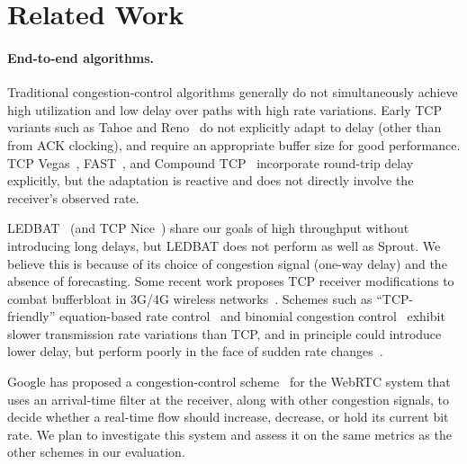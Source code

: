 \section{Related Work}
\label{sprout:related}

\paragraph{End-to-end algorithms.}

Traditional congestion-control algorithms generally do not
simultaneously achieve high utilization and low delay over paths with
high rate variations.
Early TCP variants such as Tahoe and Reno~\cite{Jacobson88} do not
explicitly adapt to delay (other than from ACK clocking), and require
an appropriate buffer size for good performance. TCP
Vegas~\cite{Brakmo94}, FAST~\cite{FAST}, and Compound TCP~\cite{CTCP}
incorporate round-trip delay explicitly, but the adaptation is
reactive and does not directly involve the receiver's observed rate.

LEDBAT~\cite{ledbat} (and TCP Nice~\cite{tcpnice}) share our goals of
high throughput without introducing long delays, but LEDBAT does not
perform as well as Sprout. We believe this is because of its choice of
congestion signal (one-way delay) and the absence of forecasting.
Some recent work proposes TCP receiver modifications to combat
bufferbloat in 3G/4G wireless networks~\cite{tcpbufferbloat}.
Schemes such as ``TCP-friendly'' equation-based
rate control~\cite{ebcc} and binomial congestion
control~\cite{binomial} exhibit slower transmission rate variations
than TCP, and in principle could introduce lower delay, but perform
poorly in the face of sudden rate changes~\cite{slowcc-dynamic}.

Google has proposed a congestion-control scheme~\cite{WebRTCdraft} for
the WebRTC system that uses an arrival-time filter at the receiver,
along with other congestion signals, to decide whether a real-time
flow should increase, decrease, or hold its current bit rate. We plan
to investigate this system and assess it on the same metrics as the
other schemes in our evaluation.

